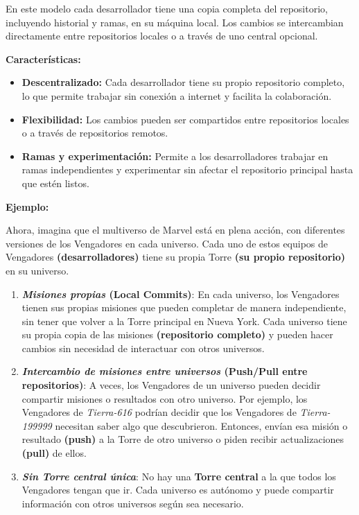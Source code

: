 \documentclass[
]{book}
\begin{document}
\begin{itemize}
  En este modelo cada desarrollador tiene una copia completa del repositorio, incluyendo historial y ramas, en su máquina local. Los cambios se intercambian directamente entre repositorios locales o a través de uno central opcional.

  \textbf{Características:}

  \begin{itemize}
  \item
    \textbf{Descentralizado:} Cada desarrollador tiene su propio repositorio completo, lo que permite trabajar sin conexión a internet y facilita la colaboración.
  \item
    \textbf{Flexibilidad:} Los cambios pueden ser compartidos entre repositorios locales o a través de repositorios remotos.
  \item
    \textbf{Ramas y experimentación:} Permite a los desarrolladores trabajar en ramas independientes y experimentar sin afectar el repositorio principal hasta que estén listos.
  \end{itemize}

  \textbf{Ejemplo:}

  Ahora, imagina que el multiverso de Marvel está en plena acción, con diferentes versiones de los Vengadores en cada universo. Cada uno de estos equipos de Vengadores \textbf{(desarrolladores)} tiene su propia Torre \textbf{(su propio repositorio)} en su universo.

  \begin{enumerate}
  \def\labelenumi{\arabic{enumi}.}
  \item
    \textbf{\emph{Misiones propias} (Local Commits)}: En cada universo, los Vengadores tienen sus propias misiones que pueden completar de manera independiente, sin tener que volver a la Torre principal en Nueva York. Cada universo tiene su propia copia de las misiones \textbf{(repositorio completo)} y pueden hacer cambios sin necesidad de interactuar con otros universos.
  \item
    \textbf{\emph{Intercambio de misiones entre universos} (Push/Pull entre repositorios)}: A veces, los Vengadores de un universo pueden decidir compartir misiones o resultados con otro universo. Por ejemplo, los Vengadores de \emph{Tierra-616} podrían decidir que los Vengadores de \emph{Tierra-199999} necesitan saber algo que descubrieron. Entonces, envían esa misión o resultado \textbf{(push)} a la Torre de otro universo o piden recibir actualizaciones \textbf{(pull)} de ellos.
  \item
    \textbf{\emph{Sin Torre central única}}: No hay una \textbf{Torre central} a la que todos los Vengadores tengan que ir. Cada universo es autónomo y puede compartir información con otros universos según sea necesario.
  \end{enumerate}
\end{itemize}
\end{document}
